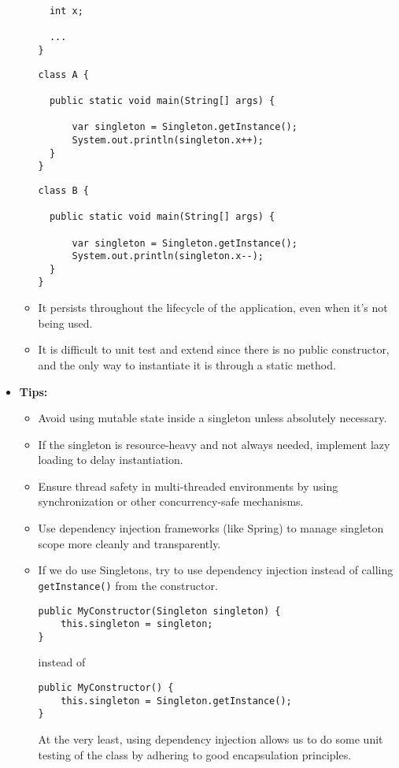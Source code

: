 \documentclass{article}
\begin{document}
\begin{itemize}
\begin{itemize}
\begin{verbatim}
  int x;

  ...
}
          \end{verbatim}
                    \begin{verbatim}
class A {

  public static void main(String[] args) {

      var singleton = Singleton.getInstance();
      System.out.println(singleton.x++);
  }
}
          \end{verbatim}
                    \begin{verbatim}
class B {

  public static void main(String[] args) {

      var singleton = Singleton.getInstance();
      System.out.println(singleton.x--);
  }
}
          \end{verbatim}
              \item It persists throughout the lifecycle of the application, even when it's not being used.
              \item It is difficult to unit test and extend since there is no public constructor, and the only way to instantiate it is through a static method.
          \end{itemize}
    \item \textbf{Tips:}
          \begin{itemize}
              \item Avoid using mutable state inside a singleton unless absolutely necessary.
              \item If the singleton is resource-heavy and not always needed, implement lazy loading to delay instantiation.
              \item Ensure thread safety in multi-threaded environments by using synchronization or other concurrency-safe mechanisms.
              \item Use dependency injection frameworks (like Spring) to manage singleton scope more cleanly and transparently.
              \item If we do use Singletons, try to use dependency injection instead of calling \lstinline|getInstance()| from the constructor.
                    \begin{verbatim}
public MyConstructor(Singleton singleton) {
    this.singleton = singleton;
}
        \end{verbatim}
                    instead of
                    \begin{verbatim}
public MyConstructor() {
    this.singleton = Singleton.getInstance();
}
        \end{verbatim}
                    At the very least, using dependency injection allows us to do some unit testing of the class by adhering to good encapsulation principles.
          \end{itemize}
\end{itemize}
\end{document}
